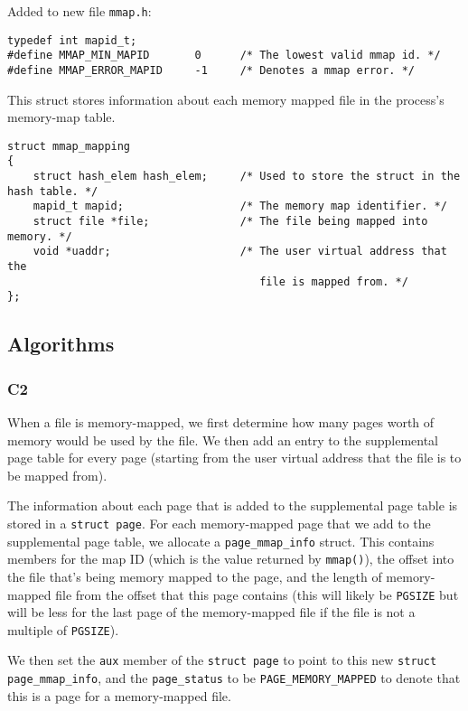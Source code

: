 \documentclass[a4wide, 11pt]{article}
\newcommand{\tx}{\texttt}
\begin{document}
Added to new file \tx{mmap.h}:
\begin{verbatim}
typedef int mapid_t;
#define MMAP_MIN_MAPID       0      /* The lowest valid mmap id. */
#define MMAP_ERROR_MAPID     -1     /* Denotes a mmap error. */
\end{verbatim}

This struct stores information about each memory mapped file in the process's memory-map table.
\begin{verbatim}
struct mmap_mapping
{
    struct hash_elem hash_elem;     /* Used to store the struct in the hash table. */
    mapid_t mapid;                  /* The memory map identifier. */
    struct file *file;              /* The file being mapped into memory. */
    void *uaddr;                    /* The user virtual address that the
                                       file is mapped from. */
};
\end{verbatim}

\subsection{Algorithms}
\subsubsection{C2}

When a file is memory-mapped, we first determine how many pages worth of memory would be used by the file. We then add an entry to the supplemental page table for every page (starting from the user virtual address that the file is to be mapped from).

The information about each page that is added to the supplemental page table is stored in a \tx{struct page}. For each memory-mapped page that we add to the supplemental page table, we allocate a \tx{page\_mmap\_info} struct. This contains members for the map ID (which is the value returned by \tx{mmap()}), the offset into the file that's being memory mapped to the page, and the length of memory-mapped file from the offset that this page contains (this will likely be \tx{PGSIZE} but will be less for the last page of the memory-mapped file if the file is not a multiple of \tx{PGSIZE}).

We then set the \tx{aux} member of the \tx{struct page} to point to this new \tx{struct page\_mmap\_info}, and the \tx{page\_status} to be \tx{PAGE\_MEMORY\_MAPPED} to denote that this is a page for a memory-mapped file.
\end{document}
